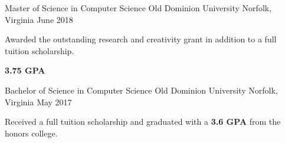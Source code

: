 \begin{cventries}
  \cventryz
    {Master of Science in Computer Science}
    {Old Dominion University}
    {Norfolk, Virginia}
    {June 2018}
    {
      \begin{cvitems}
        \item {Awarded the outstanding research and creativity grant in addition to a full tuition scholarship.}
        \item {\textbf{3.75 GPA}}
      \end{cvitems}
    }
    \cventryx
    {Bachelor of Science in Computer Science}
    {Old Dominion University}
    {Norfolk, Virginia}
    {May 2017}
    {
      \begin{cvitems}
        \item {Received a full tuition scholarship and graduated with a \textbf{3.6 GPA} from the honors college.}
      \end{cvitems}
    }
\end{cventries}

